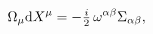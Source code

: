 \begin{equation}
   \Omega_\mu {\rm d} X^\mu = -\tfrac{i}{2}\, \omega^{\alpha \beta}
   \Sigma_{\alpha \beta},
\end{equation}

